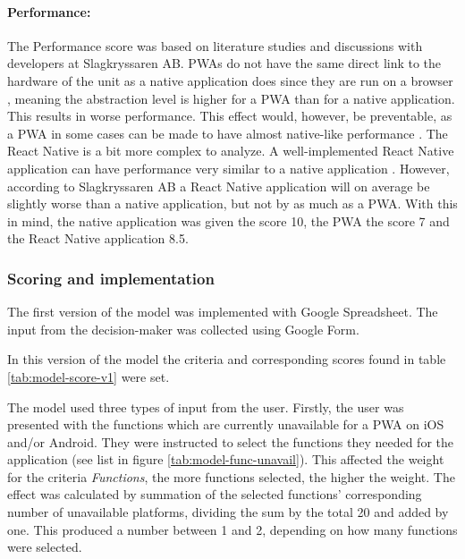 \paragraph{Performance:} The Performance score was based on literature studies and discussions with developers at Slagkryssaren AB. PWAs do not have the same direct link to the hardware of the unit as a native application does since they are run on a browser \cite[p.~12]{Yberg2018}, meaning the abstraction level is higher for a PWA than for a native application. This results in worse performance. 
This effect would, however, be preventable, as a PWA in some cases can be made to have almost native-like performance \cite[p.~43]{Yberg2018}. The React Native is a bit more complex to analyze. A well-implemented React Native application can have performance very similar to a native application \cite{Johansson2018}. However, according to Slagkryssaren AB a React Native application will on average be slightly worse than a native application, but not by as much as a PWA. With this in mind, the native application was given the score 10, the PWA the score 7 and the React Native application 8.5.

\subsubsection{Scoring and implementation}

The first version of the model was implemented with Google Spreadsheet. The input from the decision-maker was collected using Google Form.

In this version of the model the criteria and corresponding scores found in table  \ref{tab:model-score-v1} were set. 



The model used three types of input from the user.
Firstly, the user was presented with the functions which are currently unavailable for a PWA on iOS and/or Android. They were instructed to select the functions they needed for the application (see list in figure \ref{tab:model-func-unavail}). This affected the weight for the criteria \textit{Functions}, the more functions selected, the higher the weight. The effect was calculated by summation of the selected functions' corresponding number of unavailable platforms, dividing the sum by the total 20 and added by one. This produced a number between 1 and 2, depending on how many functions were selected. 



